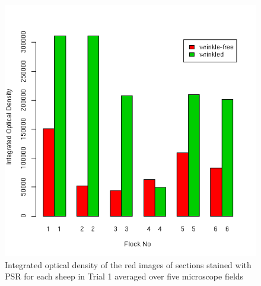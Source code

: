 %

\begin{figure}[!h]
  \centering
  \includegraphics[width=1.0\textwidth]{t1odmeans.png}
  \caption{Integrated optical density of the red images of sections stained with PSR for each sheep in Trial 1 averaged over five microscope fields}
  \label{fig:redpixt1}
\end{figure}

%

